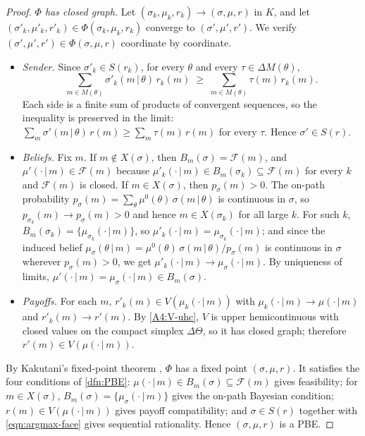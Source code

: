 \documentclass[11pt]{article}
\newcommand{\sep}{\,|\,}
\begin{document}
\begin{proof}
\emph{$\Phi$ has closed graph.} Let $(\sigma_k,\mu_k,r_k)\to(\sigma,\mu,r)$ in $K$, and let $(\sigma'_k,\mu'_k,r'_k)\in\Phi(\sigma_k,\mu_k,r_k)$ converge to $(\sigma',\mu',r')$. We verify $(\sigma',\mu',r')\in\Phi(\sigma,\mu,r)$ coordinate by coordinate.
\begin{itemize}
    \item \emph{Sender.} Since $\sigma'_k\in S(r_k)$, for every $\theta$ and every $\tau\in\Delta M(\theta)$,
    \[
        \sum_{m\in M(\theta)}\sigma'_k(m\sep\theta)\,r_k(m)\;\geq\;\sum_{m\in M(\theta)}\tau(m)\,r_k(m).
    \]
    Each side is a finite sum of products of convergent sequences, so the inequality is preserved in the limit: $\sum_{m}\sigma'(m\sep\theta)\,r(m)\geq\sum_{m}\tau(m)\,r(m)$ for every $\tau$. Hence $\sigma'\in S(r)$.
    \item \emph{Beliefs.} Fix $m$. If $m\notin X(\sigma)$, then $B_m(\sigma)=\mathcal{F}(m)$, and $\mu'(\cdot\sep m)\in\mathcal{F}(m)$ because $\mu'_k(\cdot\sep m)\in B_m(\sigma_k)\subseteq\mathcal{F}(m)$ for every $k$ and $\mathcal{F}(m)$ is closed. If $m\in X(\sigma)$, then $p_\sigma(m)>0$. The on-path probability $p_\sigma(m)=\sum_{\theta}\mu^0(\theta)\,\sigma(m\sep\theta)$ is continuous in $\sigma$, so $p_{\sigma_k}(m)\to p_\sigma(m)>0$ and hence $m\in X(\sigma_k)$ for all large $k$. For such $k$, $B_m(\sigma_k)=\{\mu_{\sigma_k}(\cdot\sep m)\}$, so $\mu'_k(\cdot\sep m)=\mu_{\sigma_k}(\cdot\sep m)$; and since the induced belief $\mu_\sigma(\theta\sep m)=\mu^0(\theta)\,\sigma(m\sep\theta)/p_\sigma(m)$ is continuous in $\sigma$ wherever $p_\sigma(m)>0$, we get $\mu'_k(\cdot\sep m)\to\mu_\sigma(\cdot\sep m)$. By uniqueness of limits, $\mu'(\cdot\sep m)=\mu_\sigma(\cdot\sep m)\in B_m(\sigma)$.
    \item \emph{Payoffs.} For each $m$, $r'_k(m)\in V(\mu_k(\cdot\sep m))$ with $\mu_k(\cdot\sep m)\to\mu(\cdot\sep m)$ and $r'_k(m)\to r'(m)$. By \cref{A4:V-uhc}, $V$ is upper hemicontinuous with closed values on the compact simplex $\Delta\Theta$, so it has closed graph; therefore $r'(m)\in V(\mu(\cdot\sep m))$.
\end{itemize}

By Kakutani's fixed-point theorem \parencite[Corollary~15.3, p.~72]{border1985}, $\Phi$ has a fixed point $(\sigma,\mu,r)$. It satisfies the four conditions of \cref{dfn:PBE}: $\mu(\cdot\sep m)\in B_m(\sigma)\subseteq\mathcal{F}(m)$ gives feasibility; for $m\in X(\sigma)$, $B_m(\sigma)=\{\mu_\sigma(\cdot\sep m)\}$ gives the on-path Bayesian condition; $r(m)\in V(\mu(\cdot\sep m))$ gives payoff compatibility; and $\sigma\in S(r)$ together with \eqref{eqn:argmax-face} gives sequential rationality. Hence $(\sigma,\mu,r)$ is a PBE.
\end{proof}
\end{document}
